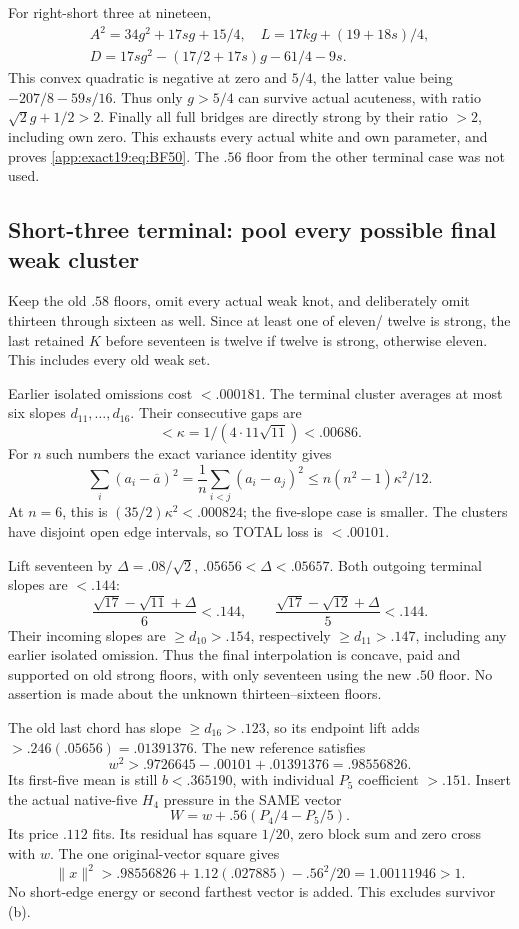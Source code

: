 \documentclass[11pt]{article}
\theoremstyle{definition}
\theoremstyle{remark}
\begin{document}
For right-short three at nineteen,
\[
\begin{gathered}
 A^2=34g^2+17sg+15/4,\quad
 L=17kg+(19+18s)/4,\\
                   D=17sg^2-(17/2+17s)g-61/4-9s .
\end{gathered}
\]
This convex quadratic is negative
at zero and \(5/4\), the latter
value being \(-207/8-59s/16\).
Thus only \(g>5/4\) can survive
actual acuteness, with ratio
\(\sqrt2g+1/2>2\).
Finally all full bridges are
directly strong by their ratio
\(>2\), including own zero.
This exhausts every actual white
and own parameter, and proves
\eqref{app:exact19:eq:BF50}.
The \(.56\) floor from the other
terminal case was not used.

\subsection{Short-three terminal: pool every possible final weak cluster}
\label{app:exact19:Bshortthreefinish}

Keep the old \(.58\) floors,
omit every actual weak knot,
and deliberately omit thirteen
through sixteen as well.
Since at least one of eleven/
twelve is strong, the last
retained \(K\) before seventeen
is twelve if twelve is strong,
otherwise eleven.
This includes every old weak set.

Earlier isolated omissions cost
\(<.000181\).
The terminal cluster averages
at most six slopes
\(d_{11},\ldots,d_{16}\).
Their consecutive gaps are
\[
                        <\kappa=1/(4\cdot11\sqrt{11})<.00686 .
\]
For \(n\) such numbers the exact
variance identity gives
\[
 \sum_i(a_i-\overline a)^2
 =\frac1n\sum_{i<j}(a_i-a_j)^2
                         \le n(n^2-1)\kappa^2/12 .
\]
At \(n=6\), this is
\((35/2)\kappa^2<.000824\);
the five-slope case is smaller.
The clusters have disjoint open
edge intervals, so TOTAL loss
is \(<.00101\).

Lift seventeen by
\(\Delta=.08/\sqrt2\),
\(.05656<\Delta<.05657\).
Both outgoing terminal slopes
are \(<.144\):
\[
 \frac{\sqrt{17}-\sqrt{11}+\Delta}{6}<.144,\qquad
 \frac{\sqrt{17}-\sqrt{12}+\Delta}{5}<.144 .
\]
Their incoming slopes are
\(\ge d_{10}>.154\), respectively
\(\ge d_{11}>.147\), including
any earlier isolated omission.
Thus the final interpolation is
concave, paid and supported on
old strong floors, with only
seventeen using the new \(.50\)
floor.
No assertion is made about the
unknown thirteen--sixteen floors.

The old last chord has slope
\(\ge d_{16}>.123\), so its
endpoint lift adds
\(>.246(.05656)=.01391376\).
The new reference satisfies
\[
                          w^2>.9726645-.00101+.01391376=.98556826 .
\]
Its first-five mean is still
\(b<.365190\), with individual
\(P_5\) coefficient \(>.151\).
Insert the actual native-five
\(H_4\) pressure in the SAME
vector
\[
                               W=w+.56(P_4/4-P_5/5).
\]
Its price \(.112\) fits.
Its residual has square \(1/20\),
zero block sum and zero cross
with \(w\).
The one original-vector square
gives
\[
 \|x\|^2>.98556826+1.12(.027885)-.56^2/20
                              =1.00111946>1 .
\]
No short-edge energy or second
farthest vector is added.
This excludes survivor (b).
\end{document}
